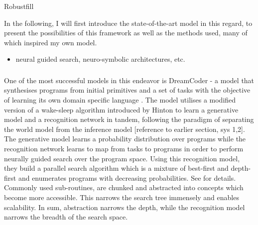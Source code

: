Robustfill \cite{Devlin_Uesato_Bhupatiraju_Singh_Mohamed_Kohli_2017}




































In the following, I will first introduce the state-of-the-art model in this regard, to present the possibilities of this framework as well as the methods used, many of which inspired my own model.

\begin{itemize}
    \item neural guided search, neuro-symbolic architectures, etc.
\end{itemize}

\subsubsection{}
One of the most successful models in this endeavor is DreamCoder - a model that synthesises programs from initial primitives and a set of tasks with the objective of learning its own domain specific language \cite{ellis_dreamcoder_2021}. The model utilises a modified version of a wake-sleep algorithm introduced by Hinton to learn a generative model and a recognition network in tandem, following the paradigm of separating the world model from the inference model \cite{hinton1995wake} [reference to earlier section, sys 1,2]. The generative model learns a probability distribution over programs while the recognition network learns to map from tasks to programs in order to perform neurally guided search over the program space. Using this recognition model, they build a parallel search algorithm which is a mixture of best-first and depth-first and enumerates programs with decreasing probabilities. See \cite{Ellis_Wong_Nye_Sable-Meyer_Cary_Morales_Hewitt_Solar-Lezama_Tenenbaum} for details.
Commonly used sub-routines, are chunked and abstracted into concepts which become more accessible. This narrows the search tree immensely and enables scalability. In sum, abstraction narrows the depth, while the recognition model narrows the breadth of the search space.

